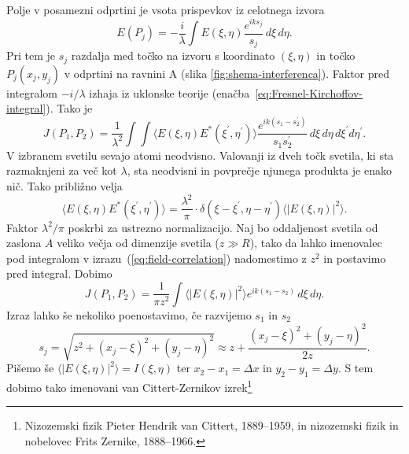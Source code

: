 Polje v posamezni odprtini je vsota prispevkov iz celotnega izvora
\begin{equation}
E(P_{j})=-\frac{i}{\lambda}\int E(\xi,\eta)\frac{e^{iks_{j}}}{s_{j}}\, d\xi\, d\eta.
\end{equation}
Pri tem je $s_{j}$ razdalja med točko na izvoru s koordinato $(\xi,\eta)$  in točko
$P_{j}(x_{j},y_{j})$ v odprtini na ravnini A (slika \ref{fig:shema-interferenca}).
Faktor pred integralom $-i/\lambda$ izhaja iz uklonske teorije (enačba~\ref{eq:Fresnel-Kirchoffov-integral}).
Tako je 
\begin{equation}
J(P_{1},P_{2})=\frac{1}{\lambda^{2}}\int\int\langle E(\xi,\eta)E^{*}(\xi^{\prime},\eta^{\prime})\rangle\frac{e^{ik(s_{1}-s_{2}^{\prime})}}{s_{1}s_{2}^{\prime}}\, d\xi\, d\eta\, d\xi^{\prime}d\eta^{\prime}.\label{eq:field-correlation}
\end{equation}
V izbranem svetilu sevajo atomi neodvisno. Valovanji iz dveh točk svetila,
ki sta razmaknjeni za več kot $\lambda$, sta neodvisni in povprečje
njunega produkta je enako nič. Tako približno velja 
\begin{equation}
\langle E(\xi,\eta)E^{*}(\xi^{\prime},\eta^{\prime})\rangle=\frac{\lambda^{2}}{\pi} \cdot \delta(\xi-\xi^{\prime},\eta-\eta^{\prime})\langle|E(\xi,\eta)|^{2}\rangle.
\label{eq:delta-Zernike}
\end{equation}
Faktor $\lambda^{2}/\pi$ poskrbi za ustrezno normalizacijo. 
Naj bo oddaljenost svetila od zaslona $A$
veliko večja od dimenzije svetila ($z\gg R$), tako da lahko imenovalec pod integralom
v izrazu~(\ref{eq:field-correlation}) nadomestimo z $z^{2}$ in postavimo
pred integral. Dobimo
\begin{equation}
J(P_{1},P_{2})=\frac{1}{\pi z^{2}}\int\langle|E(\xi,\eta)|^{2}\rangle e^{ik(s_{1}-s_{2})}\, d\xi\, d\eta.\label{eq:Zernike1}
\end{equation}
Izraz lahko še nekoliko poenostavimo, če razvijemo $s_{1}$
in $s_{2}$ 
\begin{equation}
s_{j}=\sqrt{z^{2}+(x_{j}-\xi)^{2}+(y_{j}-\eta)^{2}}\approx z+\frac{(x_{j}-\xi)^{2}+(y_{j}-\eta)^{2}}{2z}.
\end{equation}
Pišemo še $\langle|E(\xi,\eta)|^{2}\rangle=I(\xi,\eta)$ ter $x_{2}-x_{1}=\Delta x$
in $y_{2}-y_{1}=\Delta y$. S tem dobimo tako imenovani 
van Cittert-Zernikov izrek\footnote{Nizozemski fizik Pieter Hendrik van Cittert, 1889--1959, in 
nizozemski fizik in nobelovec Frits Zernike, 1888--1966.}


